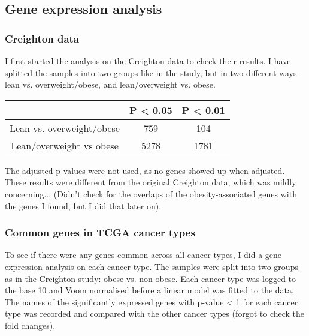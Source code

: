 \documentclass[a4paper, 11pt]{article}
\begin{document}
\subsection*{Gene expression analysis}

\subsubsection*{Creighton data}

I first started the analysis on the Creighton data to check their results.
I have splitted the samples into two groups like in the study, but in two different ways: lean vs. overweight/obese, and lean/overweight vs. obese.

\begin{center}
	\begin{tabular}{ccc}
                                  & P \textless{} 0.05 & P \textless{} 0.01 \\
		\hline
		Lean vs. overweight/obese & 759              & 104              \\
		Lean/overweight vs obese  & 5278             & 1781             \\
	\end{tabular}
\end{center}

The adjusted p-values were not used, as no genes showed up when adjusted.
These results were different from the original Creighton data, which was mildly concerning...
(Didn't check for the overlaps of the obesity-associated genes with the genes I found, but I did that later on).

\subsubsection*{Common genes in TCGA cancer types}

To see if there were any genes common across all cancer types, I did a gene expression analysis on each cancer type.
The samples were split into two groups as in the Creighton study: obese vs. non-obese.
Each cancer type was logged to the base 10 and Voom normalised before a linear model was fitted to the data.
The names of the significantly expressed genes with p-value \textless{} 1 for each cancer type was recorded and compared with the other cancer types (forgot to check the fold changes).
\end{document}
